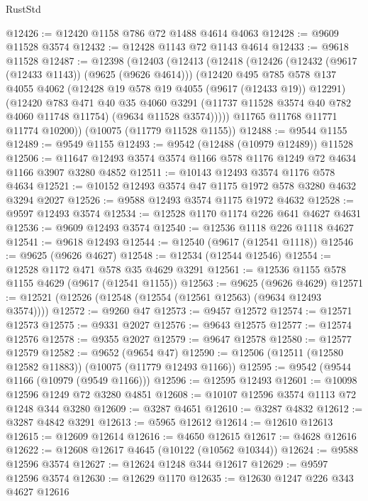 \begin{lexlean}{RustStd}
\begin{coremodule}
@12426 := @12420 @1158 @786 @72 @1488 @4614 @4063
@12428 := @9609 @11528 @3574
@12432 := @12428 @1143 @72 @1143 @4614
@12433 := @9618 @11528
@12487 := @12398
    (@12403
      (@12413
        (@12418
          (@12426
            (@12432 (@9617 (@12433 @1143)) (@9625 (@9626 @4614)))
            (@12420
              @495
              @785
              @578
              @137
              @4055
              @4062
              (@12428 @19 @578 @19 @4055 (@9617 (@12433 @19)) @12291)
              (@12420
                @783
                @471
                @40
                @35
                @4060
                @3291
                (@11737 @11528 @3574 @40 @782 @4060 @11748 @11754)
                (@9634 @11528 @3574)))))
        @11765
        @11768
        @11771
        @11774
        @10200))
    (@10075 (@11779 @11528 @1155))
@12488 := @9544 @1155
@12489 := @9549 @1155
@12493 := @9542 (@12488 (@10979 @12489)) @11528
@12506 := @11647 @12493 @3574 @3574 @1166 @578 @1176 @1249 @72 @4634 @1166 @3907 @3280 @4852
@12511 := @10143 @12493 @3574 @1176 @578 @4634
@12521 := @10152 @12493 @3574 @47 @1175 @1972 @578 @3280 @4632 @3294 @2027
@12526 := @9588 @12493 @3574 @1175 @1972 @4632
@12528 := @9597 @12493 @3574
@12534 := @12528 @1170 @1174 @226 @641 @4627 @4631
@12536 := @9609 @12493 @3574
@12540 := @12536 @1118 @226 @1118 @4627
@12541 := @9618 @12493
@12544 := @12540 (@9617 (@12541 @1118))
@12546 := @9625 (@9626 @4627)
@12548 := @12534 (@12544 @12546)
@12554 := @12528 @1172 @471 @578 @35 @4629 @3291
@12561 := @12536 @1155 @578 @1155 @4629 (@9617 (@12541 @1155))
@12563 := @9625 (@9626 @4629)
@12571 := @12521 (@12526 (@12548 (@12554 (@12561 @12563) (@9634 @12493 @3574))))
@12572 := @9260 @47
@12573 := @9457 @12572
@12574 := @12571 @12573
@12575 := @9331 @2027
@12576 := @9643 @12575
@12577 := @12574 @12576
@12578 := @9355 @2027
@12579 := @9647 @12578
@12580 := @12577 @12579
@12582 := @9652 (@9654 @47)
@12590 := @12506 (@12511 (@12580 @12582 @11883)) (@10075 (@11779 @12493 @1166))
@12595 := @9542 (@9544 @1166 (@10979 (@9549 @1166)))
@12596 := @12595 @12493
@12601 := @10098 @12596 @1249 @72 @3280 @4851
@12608 := @10107 @12596 @3574 @1113 @72 @1248 @344 @3280
@12609 := @3287 @4651
@12610 := @3287 @4832
@12612 := @3287 @4842 @3291
@12613 := @5965 @12612
@12614 := @12610 @12613
@12615 := @12609 @12614
@12616 := @4650 @12615
@12617 := @4628 @12616
@12622 := @12608 @12617 @4645 (@10122 (@10562 @10344))
@12624 := @9588 @12596 @3574
@12627 := @12624 @1248 @344 @12617
@12629 := @9597 @12596 @3574
@12630 := @12629 @1170
@12635 := @12630 @1247 @226 @343 @4627 @12616

\end{coremodule}
\end{lexlean}
